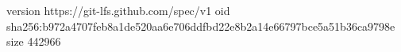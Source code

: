 version https://git-lfs.github.com/spec/v1
oid sha256:b972a4707feb8a1de520aa6e706ddfbd22e8b2a14e66797bce5a51b36ca9798e
size 442966
